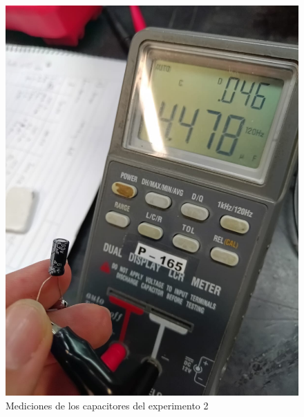 \begin{figure}[H]
\begin{minipage}{0.29\textwidth}
    \includegraphics[width=\textwidth,trim={0cm 10cm 0cm 0cm},clip]{Imagenes/MedCap2Exp2.jpeg}
    \caption*{$C=4.7~\mu F$}
    \end{minipage}
    \caption{Mediciones de los capacitores del experimento 2}
\end{figure}